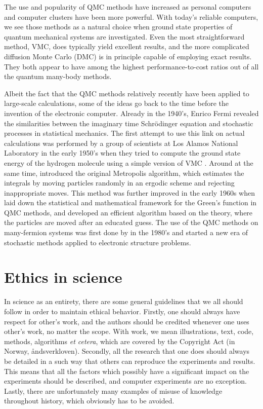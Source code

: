 The use and popularity of QMC methods have increased as personal computers and computer clusters have been more powerful. With today's reliable computers, we see those methods as a natural choice when ground state properties of quantum mechanical systems are investigated. Even the most straightforward method, VMC, does typically yield excellent results, and the more complicated diffusion Monte Carlo (DMC) is in principle capable of employing exact results. They both appear to have among the highest performance-to-cost ratios out of all the quantum many-body methods. 

Albeit the fact that the QMC methods relatively recently have been applied to large-scale calculations, some of the ideas go back to the time before the invention of the electronic computer. Already in the 1940's, Enrico Fermi revealed the similarities between the imaginary time Schrödinger equation and stochastic processes in statistical mechanics. The first attempt to use this link on actual calculations was performed by a group of scientists at Los Alamos National Laboratory in the early 1950's when they tried to compute the ground state energy of the hydrogen molecule using a simple version of VMC \cite{bajdich_electronic_2010}. Around at the same time, \citet{metropolis_monte_1949} introduced the original Metropolis algorithm, which estimates the integrals by moving particles randomly in an ergodic scheme and rejecting inappropriate moves. This method was further improved in the early 1960s when \citet{kalos} laid down the statistical and mathematical framework for the Green's function in QMC methods, and \citet{hastings_monte_1970} developed an efficient algorithm based on the theory, where the particles are moved after an educated guess. The use of the QMC methods on many-fermion systems was first done by \citet{ceperley_quantum_1986} in the 1980's and started a new era of stochastic methods applied to electronic structure problems. 

\section{Ethics in science}
In science as an entirety, there are some general guidelines that we all should follow in order to maintain ethical behavior. Firstly, one should always have respect for other's work, and the authors should be credited whenever one uses other's work, no matter the scope. With work, we mean illustrations, text, code, methods, algorithms \textit{et cetera}, which are covered by the Copyright Act (in Norway, åndsverkloven). Secondly, all the research that one does should always be detailed in a such way that others can reproduce the experiments and results. This means that all the factors which possibly have a significant impact on the experiments should be described, and computer experiments are no exception. Lastly, there are unfortunately many examples of misuse of knowledge throughout history, which obviously has to be avoided.

